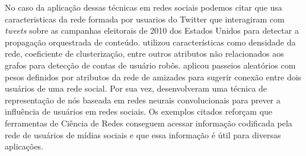 No caso da aplicação dessas técnicas em redes sociais podemos citar
\citet{ratkiewicz11} que usa caracteristicas da rede formada por usuarios do
Twitter que interagiram com \textit{tweets} sobre as campanhas eleitorais de
2010 dos Estados Unidos para detectar a propagação orquestrada de conteúdo.
\citet{varol18} utilizou características como densidade da rede, coeficiente de
clusterização, entre outros atributos não relacionados aos grafos para detecção
de contas de usuário robôs.
\citet{backstrom11} aplicou passeios aleatórios com pesos definidos por
atributos da rede de amizades para sugerir conexão entre dois usuários de uma
rede social.
Por sua vez, \citet{qiu18} desenvolveram uma técnica de representação de nós
baseada em redes neurais convolucionais para prever a influência de usuários em
redes sociais.
Os exemplos citados reforçam que ferramentas de Ciência de Redes conseguem
acessar informação codificada pela rede de usuários de mídias sociais e que essa
informação é útil para diversas aplicações.



